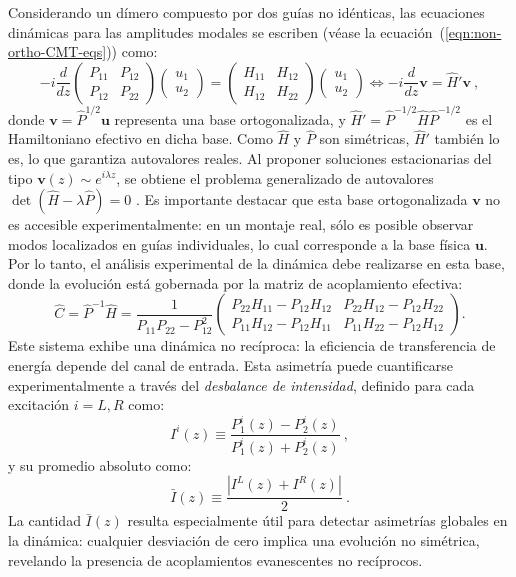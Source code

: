 Considerando un dímero compuesto por dos guías no idénticas, las ecuaciones dinámicas para las amplitudes modales se escriben (véase la ecuación~(\ref{eqn:non-ortho-CMT-eqs})) como:
\begin{equation}
	-i
	\frac{d}{dz}
	\begin{pmatrix}
		P_{11} & P_{12} \\
		P_{12} & P_{22}
	\end{pmatrix}
	\begin{pmatrix}
		u_1 \\
		u_2
	\end{pmatrix}
	=
	\begin{pmatrix}
		H_{11} & H_{12} \\
		H_{12} & H_{22}
	\end{pmatrix}
	\begin{pmatrix}
		u_1 \\
		u_2
	\end{pmatrix}
	\iff
	-i\frac{d}{dz}\textbf{v} = \hat{H}' \textbf{v} \ ,
\end{equation}
donde \( \textbf{v} = \hat{P}^{1/2} \textbf{u} \) representa una base ortogonalizada, y \( \hat{H}' = \hat{P}^{-1/2} \hat{H} \hat{P}^{-1/2} \) es el Hamiltoniano efectivo en dicha base. Como \( \hat{H} \) y \( \hat{P} \) son simétricas, \( \hat{H}' \) también lo es, lo que garantiza autovalores reales. Al proponer soluciones estacionarias del tipo \( \textbf{v}(z) \sim e^{i\lambda z} \), se obtiene el problema generalizado de autovalores $\det(\hat{H} - \lambda \hat{P}) = 0$ .
Es importante destacar que esta base ortogonalizada \( \textbf{v} \) no es accesible experimentalmente: en un montaje real, sólo es posible observar modos localizados en guías individuales, lo cual corresponde a la base física \( \textbf{u} \). Por lo tanto, el análisis experimental de la dinámica debe realizarse en esta base, donde la evolución está gobernada por la matriz de acoplamiento efectiva:
\begin{equation*}
	\hat{C} = \hat{P}^{-1} \hat{H} = \frac{1}{P_{11}P_{22} - P_{12}^2}
	\begin{pmatrix}
		P_{22}H_{11} - P_{12}H_{12} & P_{22}H_{12} - P_{12}H_{22} \\
		P_{11}H_{12} - P_{12}H_{11} & P_{11}H_{22} - P_{12}H_{12}
	\end{pmatrix}.
\end{equation*}
Este sistema exhibe una dinámica no recíproca: la eficiencia de transferencia de energía depende del canal de entrada. Esta asimetría puede cuantificarse experimentalmente a través del \textit{desbalance de intensidad}, definido para cada excitación \( i = L, R \) como:
\begin{equation*}
	I^i(z) \equiv \frac{P^i_1(z) - P^i_2(z)}{P^i_1(z) + P^i_2(z)} \ ,
\end{equation*}
y su promedio absoluto como:
\begin{equation*}
	\bar{I}(z) \equiv \frac{|I^L(z) + I^R(z)|}{2} \ .
\end{equation*}
La cantidad \( \bar{I}(z) \) resulta especialmente útil para detectar asimetrías globales en la dinámica: cualquier desviación de cero implica una evolución no simétrica, revelando la presencia de acoplamientos evanescentes no recíprocos.

